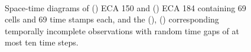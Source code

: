 \begin{figure}
	\centering
	\quad
	\\
	\quad
	\caption{Space-time diagrams of (\protect{}) ECA 150 and (\protect{}) ECA 184 containing 69 cells and 69 time stamps each, and the (\protect{}), (\protect{}) corresponding temporally incomplete observations with random time gaps of at most ten time steps.}\label{fig:space-time-example}
\end{figure}


